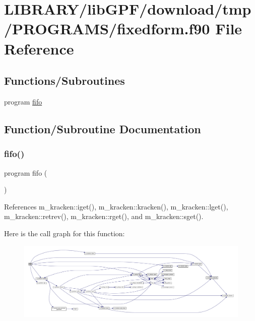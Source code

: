 \hypertarget{fixedform_8f90}{}\section{L\+I\+B\+R\+A\+R\+Y/lib\+G\+P\+F/download/tmp/\+P\+R\+O\+G\+R\+A\+M\+S/fixedform.f90 File Reference}
\label{fixedform_8f90}
\subsection*{Functions/\+Subroutines}
\begin{DoxyCompactItemize}
\item 
program \hyperlink{fixedform_8f90_a5351077e5e35d56c018014459fac67b2}{fifo}
\end{DoxyCompactItemize}


\subsection{Function/\+Subroutine Documentation}
\mbox{\label{fixedform_8f90_a5351077e5e35d56c018014459fac67b2}} 
\subsubsection{\texorpdfstring{fifo()}{fifo()}}
{\footnotesize\ttfamily program fifo (\begin{DoxyParamCaption}{ }\end{DoxyParamCaption})}



References m\+\_\+kracken\+::iget(), m\+\_\+kracken\+::kracken(), m\+\_\+kracken\+::lget(), m\+\_\+kracken\+::retrev(), m\+\_\+kracken\+::rget(), and m\+\_\+kracken\+::sget().

Here is the call graph for this function\+:
\nopagebreak
\begin{figure}[H]
\begin{center}
\leavevmode
\includegraphics[width=350pt]{fixedform_8f90_a5351077e5e35d56c018014459fac67b2_cgraph}
\end{center}
\end{figure}
